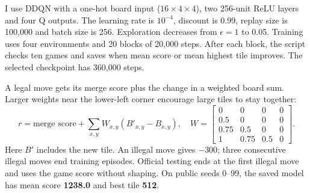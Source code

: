 \documentclass[a4paper]{article}
\begin{document}
\begin{answer}
I use DDQN with a one-hot board input ($16\times4\times4$), two 256-unit ReLU layers and four Q outputs.
The learning rate is $10^{-4}$, discount is 0.99, replay size is 100,000 and batch size is 256. Exploration decreases from $\epsilon=1$ to 0.05.
Training uses four environments and 20 blocks of 20,000 steps. After each block, the script checks ten games and saves when mean score or mean highest tile improves. The selected checkpoint has 360,000 steps.

A legal move gets its merge score plus the change in a weighted board sum. Larger weights near the lower-left corner encourage large tiles to stay together:
\[
r=\text{merge score}+\sum_{x,y}W_{x,y}(B'_{x,y}-B_{x,y}),\quad
W=\begin{bmatrix}0&0&0&0\\0.5&0&0&0\\0.75&0.5&0&0\\1&0.75&0.5&0\end{bmatrix}.
\]
Here $B'$ includes the new tile. An illegal move gives $-300$; three consecutive illegal moves end training episodes. Official testing ends at the first illegal move and uses the game score without shaping.
On public seeds 0--99, the saved model has mean score \textbf{1238.0} and best tile \textbf{512}.
\end{answer}
\end{document}
